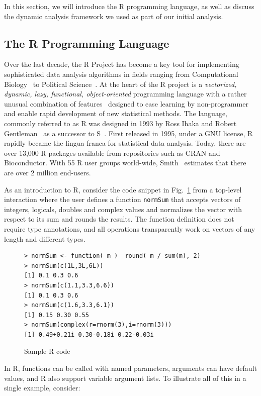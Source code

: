 \documentclass[acmsmall,review,anonymous]{acmart}\settopmatter{printfolios=true,printccs=false,printacmref=false}
\newcommand{\code}[1]{{\lstinline[style=Rin]!#1!}\xspace}
\begin{document}
In this section, we will introduce the R programming language, as well as
discuss the dynamic analysis framework we used as part of our initial
analysis.

%
%
\subsection{The R Programming Language}\label{sec:R}

Over the last decade, the R Project has become a key tool for implementing
sophisticated data analysis algorithms in fields ranging from Computational
Biology~\cite{R05} to Political Science~\cite{R:Keele:2008}. At the heart of
the R project is a \emph{vectorized, dynamic, lazy, functional,
  object-oriented} programming language with a rather unusual combination of
features~\cite{ecoop12} designed to ease learning by non-programmer and
enable rapid development of new statistical methods.  The language, commonly
referred to as R was designed in 1993 by Ross Ihaka and Robert
Gentleman~\cite{R96} as a successor to S~\cite{S88}.  First released in
1995, under a GNU license, R rapidly became the lingua franca for
statistical data analysis. Today, there are over 13,000 R packages available
from repositories such as CRAN and Bioconductor.  With 55 R user groups
world-wide, Smith~\cite{eco11} estimates that there are over 2 million
end-users.

As an introduction to R, consider the code snippet in Fig.~\ref{sample} from
a top-level interaction where the user defines a function \code{normSum}
that accepts vectors of integers, logicals, doubles and complex values and
normalizes the vector with respect to its sum and rounds the results. The
function definition does not require type annotations, and all operations
transparently work on vectors of any length and different types.

\begin{figure}[!hb]{\begin{lstlisting}
> normSum <- function( m )  round( m / sum(m), 2)
> normSum(c(1L,3L,6L))
[1] 0.1 0.3 0.6
> normSum(c(1.1,3.3,6.6))
[1] 0.1 0.3 0.6
> normSum(c(1.6,3.3,6.1))
[1] 0.15 0.30 0.55
> normSum(complex(r=rnorm(3),i=rnorm(3)))
[1] 0.49+0.21i 0.30-0.18i 0.22-0.03i
\end{lstlisting}}
\caption{Sample R code}\label{sample}
\end{figure}

In R, functions can be called with named parameters, arguments can have
default values, and R also support variable argument lists.  To illustrate
all of this in a single example, consider:
\end{document}
